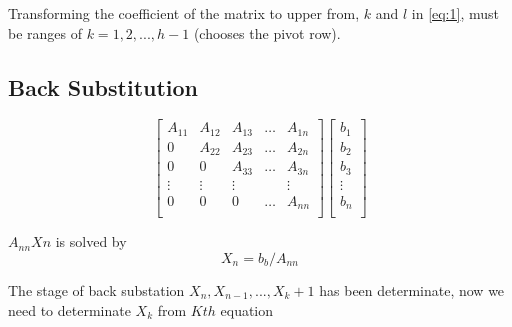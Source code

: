 \documentclass[a4paper]{article}
\numberwithin{equation}{subsection}
\begin{document}
\vspace{5mm} %
Transforming the coefficient of the matrix to upper from, $k$ and $l$ in \ref{eq:1}, must be ranges of $k = 1, 2, ... , h-1$ (chooses the pivot row).



\vspace{5mm} %
\subsection{Back Substitution}
\begin{equation} \tag{M2}
    \begin{bmatrix}
A_{11} & A_{12} & A_{13} & \dots & A_{1n} \\
0 & A_{22} & A_{23} & \dots & A_{2n} \\
0 & 0 & A_{33} & \dots & A_{3n} \\
\vdots & \vdots & \vdots &  & \vdots \\
0 & 0 & 0 & \dots & A_{nn} \\
\end{bmatrix}
\begin{bmatrix}
b_1  \\
b_2 \\
b_3  \\
 \vdots \\
b_n  \\
\end{bmatrix}
\end{equation}



\vspace{5mm} %
$A_{nn}Xn$ is solved by
\begin{equation} \tag{1.2}
    X_n = b_b/A_{nn}
\end{equation}



\vspace{5mm} %
The stage of back substation $X_n, X_{n-1},...,X_k+1$ has been determinate, now we need to determinate $X_k$ from $Kth$ equation
\end{document}
